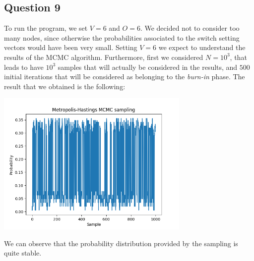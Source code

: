 \documentclass[]{article}
\begin{document}
	\subsection*{Question 9}
	To run the program, we set $V=6$ and $O=6$. We decided not to consider too many nodes, since otherwise the probabilities associated to the switch setting vectors would have been very small. Setting $V=6$ we expect to understand the results of the MCMC algorithm. Furthermore, first we considered $N=10^3$, that leads to have $10^3$ samples that will actually be considered in the results, and $500$ initial iterations that will be considered as belonging to the \emph{burn-in} phase. The result that we obtained is the following:
	\begin{center}
		\includegraphics[height=7cm]{task3/V_6_T_6_N_1000.png}
	\end{center}
	We can observe that the probability distribution provided by the sampling is quite stable.
	
\end{document}

